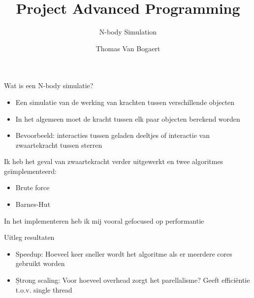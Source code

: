 \documentclass{beamer}
\title{Project Advanced Programming}
\subtitle{N-body Simulation}
\author{Thomas Van Bogaert}
\date{}
\begin{document}
	
	\frame{\titlepage}
	\begin{frame}{Wat is een N-body simulatie?}
		\note{
			
		}
		\begin{itemize}
			\item Een simulatie van de werking van krachten tussen verschillende objecten
			\item In het algemeen moet de kracht tussen elk paar objecten berekend worden
			\item Bevoorbeeld: interacties tussen geladen deeltjes of interactie van zwaartekracht tussen sterren
		\end{itemize}
		
	\end{frame}
	
	\begin{frame}
			Ik heb het geval van zwaartekracht verder uitgewerkt en twee algoritmes ge\"implementeerd:
			\begin{itemize}
				\item Brute force
				\item Barnes-Hut
			\end{itemize}
			In het implementeren heb ik mij vooral gefocused op performantie
	\end{frame}
	
	\begin{frame}{Uitleg resultaten}
		\begin{itemize}
			\item Speedup: Hoeveel keer sneller wordt het algoritme als er meerdere cores gebruikt worden
			\item \b Strong scaling: Voor hoeveel overhead zorgt het parellalisme? Geeft effici\"entie t.o.v. single thread
		\end{itemize}
	\end{frame}
	
	
\end{document}
